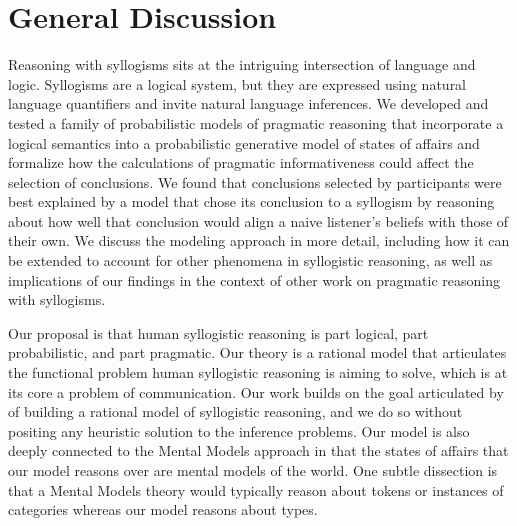 \documentclass[floatsintext, doc]{apa6}
\begin{document}









\section{General Discussion}

Reasoning with syllogisms sits at the intriguing intersection of language and logic. 
Syllogisms are a logical system, but they are expressed using natural language quantifiers and invite natural language inferences. 
We developed and tested a family of probabilistic models of pragmatic reasoning that incorporate a logical semantics into a probabilistic generative model of states of affairs and formalize how the calculations of pragmatic informativeness could affect the selection of conclusions.
We found that conclusions selected by participants were best explained by a model that chose its conclusion to a syllogism by reasoning about how well that conclusion would align a naive listener's beliefs with those of their own. 
We discuss the modeling approach in more detail, including how it can be extended to account for other phenomena in syllogistic reasoning, as well as implications of our findings in the context of other work on pragmatic reasoning with syllogisms.

Our proposal is that human syllogistic reasoning is part logical, part probabilistic, and part pragmatic. Our theory is a rational model that articulates the functional problem human syllogistic reasoning is aiming to solve, which is at its core a problem of communication. Our work builds on the goal articulated by  of building a rational model of syllogistic reasoning, and we do so without positing any heuristic solution to the inference problems. Our model is also deeply connected to the Mental Models approach \cite{johnson1975models, johnson2015logic} in that the states of affairs that our model reasons over are mental models of the world. 
One subtle dissection is that a Mental Models theory would typically reason about tokens or instances of categories whereas our model reasons about types. 
\end{document}
